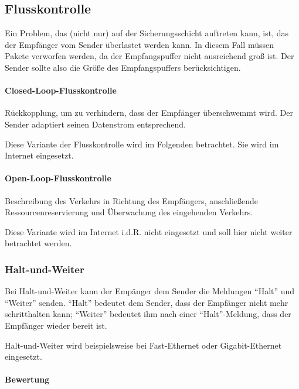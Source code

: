 \documentclass[a4paper, 14pt]{article}
\begin{document}
	\subsection{Flusskontrolle}

	Ein Problem, das (nicht nur) auf der Sicherungsschicht auftreten kann, ist, das der Empfänger vom Sender überlastet werden kann.
	In diesem Fall müssen Pakete verworfen werden, da der Empfangspuffer nicht ausreichend groß ist.
	Der Sender sollte also die Größe des Empfangspuffers berücksichtigen.

	\paragraph{Closed-Loop-Flusskontrolle}

	Rückkopplung, um zu verhindern, dass der Empfänger überschwemmt wird.
	Der Sender adaptiert seinen Datenstrom entsprechend.

	Diese Variante der Flusskontrolle wird im Folgenden betrachtet.
	Sie wird im Internet eingesetzt.

	\paragraph{Open-Loop-Flusskontrolle}

	Beschreibung des Verkehrs in Richtung des Empfängers, anschließende Ressourcenreservierung und Überwachung des eingehenden Verkehrs.

	Diese Variante wird im Internet i.d.R. nicht eingesetzt und soll hier nicht weiter betrachtet werden.

	\subsubsection{Halt-und-Weiter}

	Bei Halt-und-Weiter kann der Empänger dem Sender die Meldungen \enquote{Halt} und \enquote{Weiter} senden.
	\enquote{Halt} bedeutet dem Sender, dass der Empfänger nicht mehr schritthalten kann; \enquote{Weiter} bedeutet ihm nach einer \enquote{Halt}-Meldung, dass der Empfänger wieder bereit ist.
	
	Halt-und-Weiter wird beispielsweise bei Fast-Ethernet oder Gigabit-Ethernet eingesetzt.

	\paragraph{Bewertung}
\end{document}
